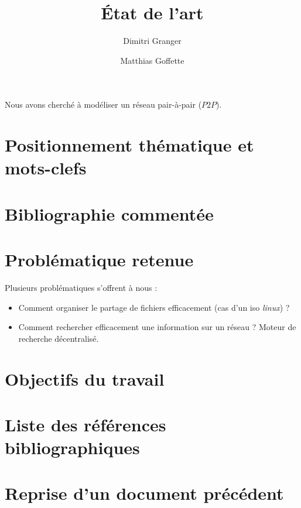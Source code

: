 \documentclass[11pt,a4paper]{article}
\title{\'Etat de l'art}
\date{}
\author{Dimitri Granger \and Matthias Goffette}
\begin{document}

\maketitle

\begin{it}
Nous avons cherché à modéliser un réseau pair-à-pair ($P2P$).
\end{it}

\section{Positionnement thématique et mots-clefs}

\section{Bibliographie commentée}

\section{Problématique retenue}

Plusieurs problématiques s'offrent à nous :
\begin{itemize}
	\item Comment organiser le partage de fichiers efficacement (cas d'un iso \emph{linux}) ?
	\item Comment rechercher efficacement une information sur un réseau ? Moteur de recherche décentralisé.
\end{itemize}

\section{Objectifs du travail}

\section{Liste des références bibliographiques}


\section{Reprise d'un document précédent}
\end{document}
